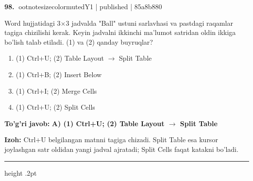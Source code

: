 \documentclass[10pt,a4paper]{article}
\begin{document}
\textbf{\color{ink}98.} {ootnotesizecolor{muted}Y1 | published | 85a8b880}
\par
Word hujjatidagi 3\ensuremath{\times}3 jadvalda "Ball" ustuni sarlavhasi va pastdagi raqamlar tagiga chizilishi kerak. Keyin jadvalni ikkinchi ma'lumot satridan oldin ikkiga bo'lish talab etiladi. (1) va (2) qanday buyruqlar?
\begin{enumerate}[label=\Alph*),leftmargin=9mm]
\item (1) Ctrl+U; (2) Table Layout \ensuremath{\rightarrow} Split Table
\item (1) Ctrl+B; (2) Insert Below
\item (1) Ctrl+I; (2) Merge Cells
\item (1) Ctrl+U; (2) Split Cells
\end{enumerate}
\begin{tcolorbox}[enhanced,breakable,colback=teal!4,colframe=teal!55!black,boxrule=0.45pt,arc=1.2mm,left=2.8mm,right=2.8mm,top=2mm,bottom=2mm]
\textbf{\color{teal}To'g'ri javob:} \textbf{A) (1) Ctrl+U; (2) Table Layout \ensuremath{\rightarrow} Split Table}
\par\smallskip
\textbf{Izoh:} Ctrl+U belgilangan matnni tagiga chizadi. Split Table esa kursor joylashgan satr oldidan yangi jadval ajratadi; Split Cells faqat katakni bo'ladi.
\end{tcolorbox}
\vspace{2mm}\hrule height .2pt\vspace{2mm}
\end{document}
